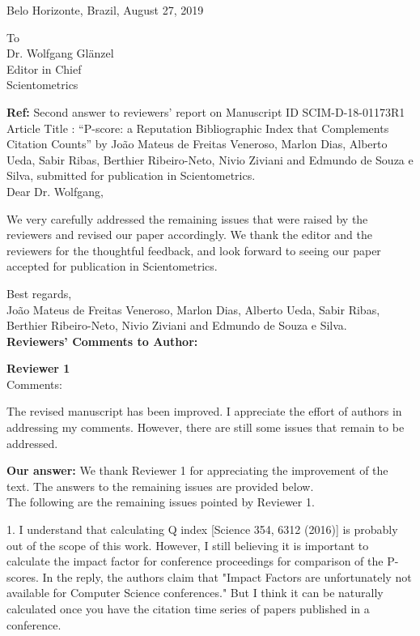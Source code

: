 \documentclass[a4wide,11pt]{article}
\begin{document}
\begin{flushright}
Belo Horizonte, Brazil, August 27, 2019
\end{flushright}
\begin{flushleft}
To\\
Dr. Wolfgang Glänzel\\
Editor in Chief\\
Scientometrics
\end{flushleft}

\noindent
{\bf Ref:} 
Second answer to reviewers’ report on Manuscript ID SCIM-D-18-01173R1 Article Title :
``P-score: a Reputation Bibliographic Index that Complements Citation Counts'' by João
Mateus de Freitas Veneroso, Marlon Dias, Alberto Ueda, Sabir Ribas, Berthier Ribeiro-Neto,
Nivio Ziviani and Edmundo de Souza e Silva, submitted for publication in Scientometrics.\\

\noindent
Dear Dr. Wolfgang,

We very carefully addressed the remaining issues that were raised by the reviewers and revised our
paper accordingly. We thank the editor and the reviewers for the thoughtful feedback, and
look forward to seeing our paper accepted for publication in Scientometrics.

Best regards,\\
João Mateus de Freitas Veneroso, Marlon Dias, Alberto Ueda, Sabir Ribas, Berthier
Ribeiro-Neto, Nivio Ziviani and Edmundo de Souza e Silva.\\

\textbf{Reviewers' Comments to Author:}

{\bf Reviewer 1}\\
\noindent
Comments:

The revised manuscript has been improved. I appreciate the effort of authors in addressing 
my comments. However, there are still some issues that remain to be addressed.

{\bf Our answer:}
We thank Reviewer 1 for appreciating the improvement of the text. The answers to the remaining
issues are provided below.
\\

The following are the remaining issues pointed by Reviewer 1.


1.  I understand that calculating Q index [Science 354, 6312 (2016)] is probably out of the scope of this work. However, I still believing it is important to calculate the impact factor for conference proceedings for comparison of the P-scores. In the reply, the authors claim that "Impact Factors are unfortunately not available for Computer Science conferences." But I think it can be naturally calculated once you have the citation time series of papers published in a conference. 
\end{document}
